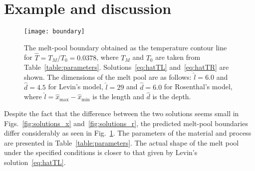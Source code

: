 \documentclass{article}
\begin{document}
\section{Example and discussion}

\begin{figure}
    \centering
    \texttt{[image: boundary]}
    \caption{
        The melt-pool boundary obtained as the temperature contour line for $\hat{T}=T_M/T_0=0.0378$,
        where $T_M$ and $T_0$ are taken from Table~\ref{table:parameters}.
        Solutions~\eqref{eq:hatTL} and~\eqref{eq:hatTR} are shown.
        The dimensions of the melt pool are as follows:
        $\hat{l} = 6.0$ and $\hat{d} = 4.5$ for Levin's model,
        $\hat{l} = 29$ and $\hat{d} = 6.0$ for Rosenthal's model,
        where $\hat{l} = \hat{x}_\text{max} - \hat{x}_\text{min}$ is the length and $\hat{d}$ is the depth.
    }\label{fig:boundary}
\end{figure}

Despite the fact that the difference between the two solutions seems small
in Figs.~\ref{fig:solutions_x} and~\ref{fig:solutions_r},
the predicted melt-pool boundaries differ considerably as seen in Fig.~\ref{fig:boundary}.
The parameters of the material and process are presented in Table~\ref{table:parameters}.
The actual shape of the melt pool under the specified conditions is closer to that
given by Levin's solution~\eqref{eq:hatTL}.
\end{document}
